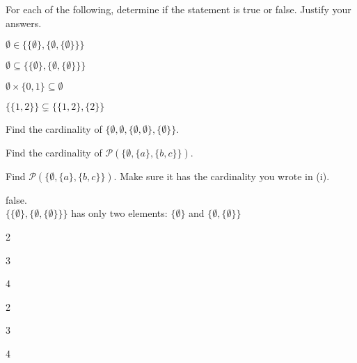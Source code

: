\documentclass[12pt]{exam}
\begin{document}
\begin{qparts}
    \item For each of the following, determine if the statement is true or false. Justify your answers.
    \begin{qsubparts}
        \item $\emptyset \in \{\{\emptyset\}, \{\emptyset , \{\emptyset\}\}\}$
        \item $\emptyset \subseteq \{\{\emptyset\}, \{\emptyset , \{\emptyset\}\}\}$
        \item $\emptyset \times  \{0,1\} \subseteq \emptyset$
        \item $\{\{1, 2\}\} \subsetneq \{ \{1,2\}, \{2\} \}$
    \end{qsubparts}

    \item Find the cardinality of $\{\emptyset, \emptyset, \{\emptyset, \emptyset\}, \{\emptyset\}\}.$

    \item
        \begin{qsubparts}
        \item Find the cardinality of $\mathcal{P}(\{\emptyset, \{a\}, \{b, c\}\})$.
        \item Find $\mathcal{P}(\{\emptyset, \{a\}, \{b, c\}\})$. Make sure it has the cardinality you wrote in (i).

    \end{qsubparts}

\end{qparts}

\begin{solution}
    \begin{qparts}
        \item 
        \begin{qsubparts}
            \item false.\\
            $\{\{\emptyset\}, \{\emptyset , \{\emptyset\}\}\}$ has only two elements: $\{\emptyset\}$ and $\{ \emptyset, \{ \emptyset\}\}$
            \item 2
            \item 3
            \item 4
        \end{qsubparts}

        \item 2
        \item 3
        \item 4
    \end{qparts}
\end{solution}
\end{document}
